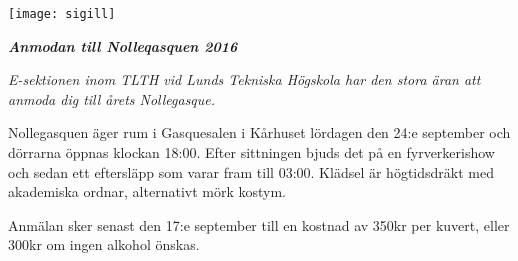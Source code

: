 \documentclass[11pt]{article}
\def\date{2016}
\def\doctitle{Anmodan till Nolleqasquen \date}
\begin{document}

    \begin{center}
        \texttt{[image: sigill]}
        \par
        \vspace*{8mm}

        \textit{\textbf{\Large \doctitle}}

    \end{center}
    \vspace{1mm}

    {\it
    E-sektionen inom TLTH vid Lunds Tekniska Högskola
    har den stora äran att anmoda dig
    till årets Nollegasque.

    \vspace{1mm}

    Nollegasquen äger rum i Gasquesalen i Kårhuset lördagen den 24:e september och dörrarna öppnas klockan 18:00. Efter sittningen bjuds det på en fyrverkerishow och sedan ett eftersläpp som varar fram till 03:00. Klädsel är högtidsdräkt med akademiska ordnar, alternativt mörk kostym.

    \vspace{1mm}

    Anmälan sker senast den 17:e september till en kostnad av 350kr per kuvert, eller 300kr om ingen alkohol önskas.
    }
\end{document}
